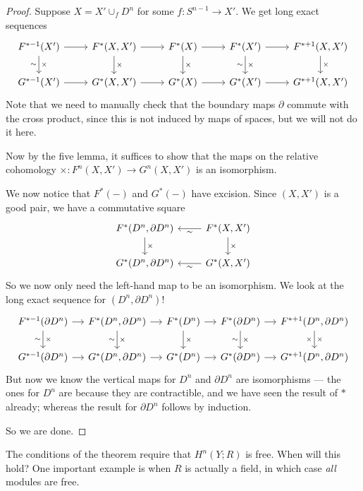 \documentclass[a4paper]{article}
\begin{document}
\begin{proof}
  Suppose $X = X' \cup_f D^n$ for some $f:S^{n - 1} \to X'$. We get long exact sequences
  \[
    \begin{tikzcd}
      F^{* - 1}(X') \ar[r] \ar[d, "\times", "\sim"'] & F^*(X, X') \ar[r] \ar[d, "\times"] & F^*(X) \ar[r] \ar[d, "\times"] & F^*(X') \ar[r] \ar[d, "\times", "\sim"'] & F^{* + 1}(X, X') \ar[d, "\times"]\\
      G^{* - 1}(X') \ar[r] & G^*(X, X') \ar[r] & G^*(X) \ar[r] & G^*(X') \ar[r] & G^{* + 1}(X, X')
    \end{tikzcd}
  \]
  Note that we need to manually check that the boundary maps $\partial$ commute with the cross product, since this is not induced by maps of spaces, but we will not do it here.

  Now by the five lemma, it suffices to show that the maps on the relative cohomology $\times: F^n(X, X') \to G^n(X, X')$ is an isomorphism.

  We now notice that $F^*(-)$ and $G^*(-)$ have excision. Since $(X, X')$ is a good pair, we have a commutative square
  \[
    \begin{tikzcd}
      F^*(D^n, \partial D^n) \ar[d, "\times"] & F^*(X, X') \ar[l, "\sim"] \ar[d, "\times"] \\
      G^*(D^n, \partial D^n) & G^*(X, X') \ar[l, "\sim"]
    \end{tikzcd}
  \]
  So we now only need the left-hand map to be an isomorphism. We look at the long exact sequence for $(D^n, \partial D^n)$!
  \[
    \begin{tikzcd}[column sep=small]
      F^{* - 1}(\partial D^n) \ar[r] \ar[d, "\times", "\sim"'] & F^*(D^n, \partial D^n) \ar[r] \ar[d, "\times", "\sim"'] & F^*(D^n) \ar[r] \ar[d, "\times"] & F^*(\partial D^n) \ar[r] \ar[d, "\times", "\sim"'] & F^{* + 1}(D^n, \partial D^n) \ar[d, "\times", "\times"']\\
      G^{* - 1}(\partial D^n) \ar[r] & G^*(D^n, \partial D^n) \ar[r] & G^*(D^n) \ar[r] & G^*(\partial D^n) \ar[r] & G^{* + 1}(D^n, \partial D^n)
    \end{tikzcd}
  \]
  But now we know the vertical maps for $D^n$ and $\partial D^n$ are isomorphisms --- the ones for $D^n$ are because they are contractible, and we have seen the result of $*$ already; whereas the result for $\partial D^n$ follows by induction.

  So we are done.
\end{proof}
The conditions of the theorem require that $H^n(Y; R)$ is free. When will this hold? One important example is when $R$ is actually a field, in which case \emph{all} modules are free.
\end{document}
